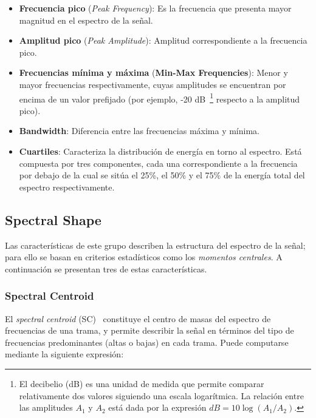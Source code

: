 \begin{itemize}
    \label{itemize:basic-spectral-features}
    \item \textbf{Frecuencia pico} (\textit{Peak Frequency}): Es la frecuencia que presenta mayor magnitud en el espectro de la señal.
    \item \textbf{Amplitud pico} (\textit{Peak Amplitude}): Amplitud correspondiente a la frecuencia pico.
    \item \textbf{Frecuencias mínima y máxima} (\textbf{Min-Max Frequencies}): Menor y mayor frecuencias respectivamente, cuyas amplitudes se encuentran por encima de un valor prefijado (por ejemplo, -20 dB~\footnote{El decibelio (dB) es una unidad de medida que permite comparar relativamente dos valores siguiendo una escala logarítmica.
    La relación entre las amplitudes $A_1$ y $A_2$ está dada por la expresión $dB = 10\log(A_1/A_2)$.} respecto a la amplitud pico).
    \item \textbf{Bandwidth}: Diferencia entre las frecuencias máxima y mínima.
    \item \textbf{Cuartiles}: Caracteriza la distribución de energía en torno al espectro.
    Está compuesta por tres componentes, cada una correspondiente a la frecuencia por debajo de la cual se sitúa el 25\%, el 50\% y el 75\% de la energía total del espectro respectivamente.
\end{itemize}

\subsection{Spectral Shape}\label{subsec:spectralShape}

Las características de este grupo describen la estructura del espectro de la señal;
para ello se basan en criterios estadísticos como los \textit{momentos centrales}.
A continuación se presentan tres de estas características.

\subsubsection{Spectral Centroid}\label{subsubsec:spectralCentroid}

El \textit{spectral centroid} (SC)~\cite{Fagerlund07,Kim05,Lasseck14,Manjunath02,Peters04} constituye el centro de masas del espectro de frecuencias de una trama, y permite describir la señal en términos del tipo de frecuencias predominantes (altas o bajas) en cada trama.
Puede computarse mediante la siguiente expresión:

